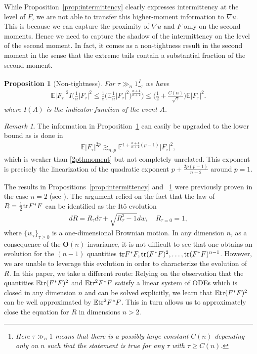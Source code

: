 \documentclass[english, letterpaper,12pt,reqno]{amsart}
\newtheorem{proposition}[theorem]{Proposition}
\theoremstyle{remark}
\newtheorem{remark}[theorem]{Remark}
\theoremstyle{plain}
\newcommand{\1}{\mathbf{1}}
\newcommand{\E}{\mathbb{E}}
\def\bbE{\mathbb E}
\def\tr{{\rm tr}}
\begin{document}
\medskip \noindent
While Proposition~\ref{prop:intermittency} clearly expresses intermittency at the level of $F$, we are not able to transfer this higher-moment information to $\nabla u$. This is because we can capture the proximity of $\nabla u$ and $F$ only on the second moments. Hence we need to capture the shadow of the intermittency on the level of the second moment. In fact, it comes as a non-tightness result in the second moment in the sense that the extreme tails contain a substantial fraction of the second moment.
%
 \begin{proposition}[Non-tightness] \label{prop:nontightness}
    For $\tau \gg_n 1$\footnote{Here $\tau \gg_n 1$ means that there is a possibly large constant $C(n)$ depending only on $n$ such that the statement is true for any $\tau$ with $\tau \geq C(n)$.}, we have %
	\begin{align}\label{prop02}
		\E | F_{ \tau } |^2 I \Big( { \textstyle \frac{ 1 }{ n } } | F_{ \tau } |^2 \leq { \textstyle \frac{ 1 }{ e  } } \big( { \textstyle \E \frac{ 1 }{ n } } | F_{ \tau } |^2 \big)^{ \frac{ n + 4 }{ n + 2 } } \Big)
		\leq \Big( \frac{ 1 }{ 2 } + \frac{ C(n) }{ \sqrt{\tau} } \Big) \E| F_{ \tau }  |^2  .
	\end{align}
 where $I(A)$ is the indicator function of the event $A$.	
\end{proposition}
%
\begin{remark}\label{cor:nontightness} The information in Proposition~\ref{prop:nontightness} can easily be upgraded to the lower bound as is done in \cite[Theorem 3 \& (118)]{MOW25}
 \begin{align*}
\E  |F_\tau|^{2p} \gtrsim_{n,p}  \bbE^{1+\frac{n+4}{n+2}(p-1)}  |F_\tau|^{2},
\end{align*}
%
which is weaker than \eqref{2pthmoment} but not completely unrelated. This exponent is precisely the linearization of the quadratic exponent $p+\frac{2p(p-1)}{n+2}$ around $p=1$. 
\end{remark}
%

\noindent
The results in Propositions~\ref{prop:intermittency} and ~\ref{prop:nontightness} were previously proven in the case $n=2$ (see \cite[Lemma 2, Lemma 4]{MOW25}). The argument relied on the fact that the law of $R=\frac{1}{2}\tr F^*F$ can be identified as the Itô evolution %
%
\begin{align*}
    dR= R_{\tau} d\tau +\sqrt{R_\tau^2-1} dw, \quad R_{\tau =0}=1,
\end{align*} 
%
where $\{w_\tau\}_{\tau\geq 0}$ is a one-dimensional Brownian motion. In any dimension $n$, as a consequence of the $\textbf{O}(n)$-invariance, it is not difficult to see that one obtains an evolution for the $(n-1)$ quantities $\tr F^*F, \tr (F^*F)^2,\dots ,\tr (F^*F)^{n-1}$. However, we are unable to leverage this evolution in order to characterize the evolution of $R$. In this paper, we take a different route: Relying on the observation that the quantities $\E \tr (F^*F)^2 $ and $\E\tr^2 F^*F $ satisfy a linear system of ODEs which is closed in any dimension $n$ and can be solved explicitly, we learn that $\bbE\tr (F^*F)^2$ can be well approximated by $\bbE \tr^2 F^* F$. This in turn allows us to approximately close the equation for $ R $ in dimensions $ n > 2 $.
\end{document}
